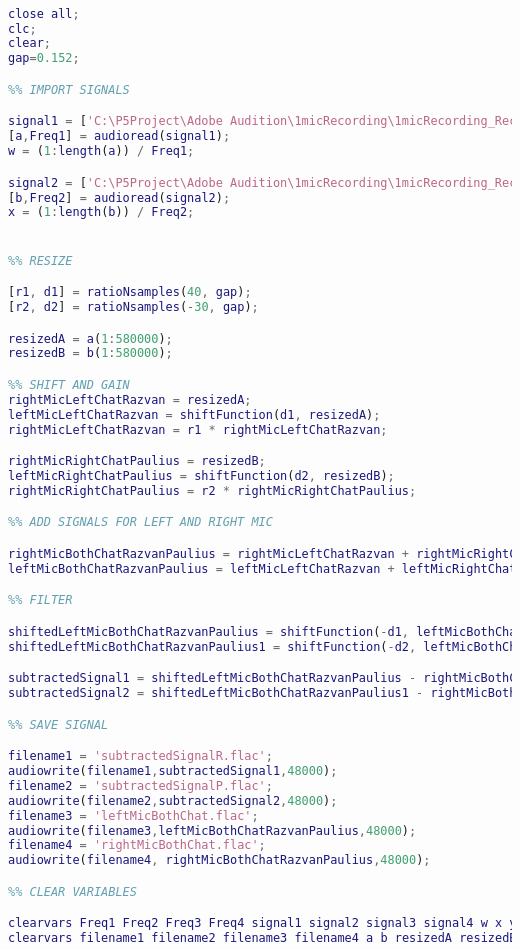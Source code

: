 \begin{lstlisting}[language=Matlab, label=lst:syntheticSamplesCode]
%% CLEANUP

close all;
clc;
clear;
gap=0.152;

%% IMPORT SIGNALS

signal1 = ['C:\P5Project\Adobe Audition\1micRecording\1micRecording_Recorded\Razvan.wav'];
[a,Freq1] = audioread(signal1);
w = (1:length(a)) / Freq1;

signal2 = ['C:\P5Project\Adobe Audition\1micRecording\1micRecording_Recorded\Paulius.wav'];
[b,Freq2] = audioread(signal2);
x = (1:length(b)) / Freq2;


%% RESIZE

[r1, d1] = ratioNsamples(40, gap);
[r2, d2] = ratioNsamples(-30, gap);

resizedA = a(1:580000);
resizedB = b(1:580000);

%% SHIFT AND GAIN
rightMicLeftChatRazvan = resizedA;
leftMicLeftChatRazvan = shiftFunction(d1, resizedA);
rightMicLeftChatRazvan = r1 * rightMicLeftChatRazvan;

rightMicRightChatPaulius = resizedB;
leftMicRightChatPaulius = shiftFunction(d2, resizedB);
rightMicRightChatPaulius = r2 * rightMicRightChatPaulius;

%% ADD SIGNALS FOR LEFT AND RIGHT MIC

rightMicBothChatRazvanPaulius = rightMicLeftChatRazvan + rightMicRightChatPaulius;
leftMicBothChatRazvanPaulius = leftMicLeftChatRazvan + leftMicRightChatPaulius;

%% FILTER

shiftedLeftMicBothChatRazvanPaulius = shiftFunction(-d1, leftMicBothChatRazvanPaulius);
shiftedLeftMicBothChatRazvanPaulius1 = shiftFunction(-d2, leftMicBothChatRazvanPaulius);

subtractedSignal1 = shiftedLeftMicBothChatRazvanPaulius - rightMicBothChatRazvanPaulius;
subtractedSignal2 = shiftedLeftMicBothChatRazvanPaulius1 - rightMicBothChatRazvanPaulius;

%% SAVE SIGNAL

filename1 = 'subtractedSignalR.flac';
audiowrite(filename1,subtractedSignal1,48000);
filename2 = 'subtractedSignalP.flac';
audiowrite(filename2,subtractedSignal2,48000);
filename3 = 'leftMicBothChat.flac';
audiowrite(filename3,leftMicBothChatRazvanPaulius,48000);
filename4 = 'rightMicBothChat.flac';
audiowrite(filename4, rightMicBothChatRazvanPaulius,48000);

%% CLEAR VARIABLES

clearvars Freq1 Freq2 Freq3 Freq4 signal1 signal2 signal3 signal4 w x y z
clearvars filename1 filename2 filename3 filename4 a b resizedA resizedB
\end{lstlisting}





